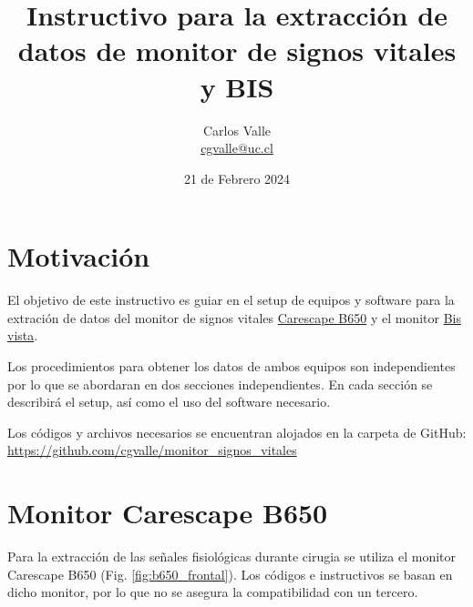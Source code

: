 \documentclass{article}
\begin{document}
\title{\huge \textbf{Instructivo para la extracción de datos de monitor de signos vitales y BIS } \vspace{8cm}}
\author{Carlos Valle \\ \href{mailto:cgvalle@uc.cl}{cgvalle@uc.cl} }
\date{21 de Febrero 2024}
\maketitle


\newpage

\section{Motivación}

El objetivo de este instructivo es guiar en el setup de equipos y software para la extración de datos del monitor de signos vitales \href{https://www.gehealthcare.com/products/patient-monitoring/patient-monitors/carescape-monitor-b650}{Carescape B650} y el monitor \href{https://www.medtronic.com/covidien/es-cl/products/brain-monitoring/bis-complete-4-channel-monitor.html}{Bis vista}.

Los procedimientos para obtener los datos de ambos equipos son independientes por lo que se abordaran en dos secciones independientes. En cada sección se describirá el setup, así como el uso del software necesario. 

Los códigos y archivos necesarios se encuentran alojados en la carpeta de GitHub: \url{https://github.com/cgvalle/monitor_signos_vitales} 


\newpage



\section{Monitor Carescape B650}
Para la extracción de las señales fisiológicas durante cirugia se utiliza el monitor Carescape B650 (Fig. \ref{fig:b650_frontal}). Los códigos e instructivos se basan en dicho monitor, por lo que no se asegura la compatibilidad con un tercero. 
\end{document}
